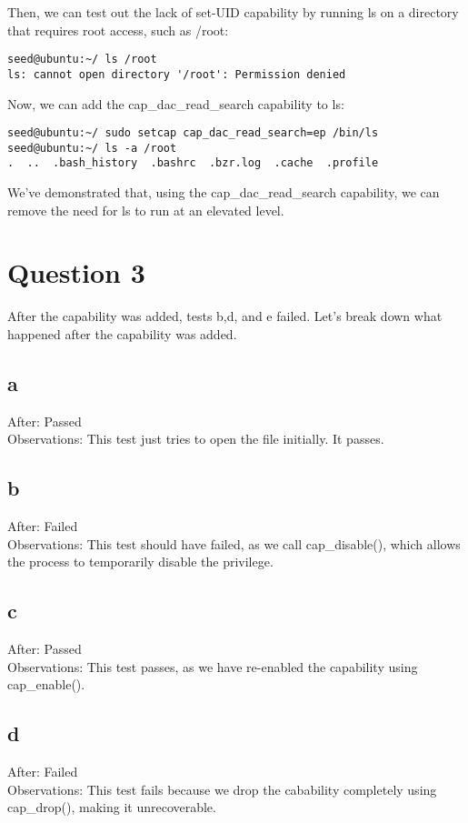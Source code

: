 \documentclass[10pt,letterpaper]{article}
\begin{document}
Then, we can test out the lack of set-UID capability by running ls on a directory
that requires root access, such as /root:\\

\begin{lstlisting}
seed@ubuntu:~/ ls /root
ls: cannot open directory '/root': Permission denied
\end{lstlisting}

Now, we can add the cap\_dac\_read\_search capability to ls:
\begin{lstlisting}
seed@ubuntu:~/ sudo setcap cap_dac_read_search=ep /bin/ls
seed@ubuntu:~/ ls -a /root
.  ..  .bash_history  .bashrc  .bzr.log  .cache  .profile
\end{lstlisting}

We've demonstrated that, using the cap\_dac\_read\_search capability, we can remove
the need for ls to run at an elevated level.

\section*{Question 3}
After the capability was added, tests b,d, and e failed. Let's break down what
happened after the capability was added.
\subsection*{a}
After: Passed\\
Observations: This test just tries to open the file initially. It passes. 

\subsection*{b}
After: Failed\\
Observations: This test should have failed, as we call cap\_disable(), which
allows the process to temporarily disable the privilege.

\subsection*{c}
After: Passed\\
Observations: This test passes, as we have re-enabled the capability using
cap\_enable().

\subsection*{d}
After: Failed\\
Observations: This test fails because we drop the cabability completely using
cap\_drop(), making it unrecoverable.
\end{document}
